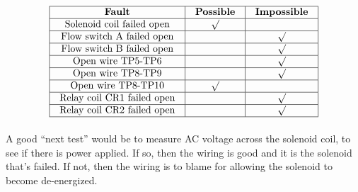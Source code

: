 
$$\vbox{\offinterlineskip
\halign{\strut
\vrule \quad\hfil # \ \hfil & 
\vrule \quad\hfil # \ \hfil & 
\vrule \quad\hfil # \ \hfil \vrule \cr
\noalign{\hrule}
%
{\bf Fault} & {\bf Possible} & {\bf Impossible} \cr
%
\noalign{\hrule}
%
Solenoid coil failed open & $\surd$ &  \cr
%
\noalign{\hrule}
%
Flow switch A failed open &  & $\surd$ \cr
%
\noalign{\hrule}
%
Flow switch B failed open &  & $\surd$ \cr
%
\noalign{\hrule}
%
Open wire TP5-TP6 &  & $\surd$ \cr
%
\noalign{\hrule}
%
Open wire TP8-TP9 &  & $\surd$ \cr
%
\noalign{\hrule}
%
Open wire TP8-TP10 & $\surd$ &  \cr
%
\noalign{\hrule}
%
Relay coil CR1 failed open &  & $\surd$ \cr
%
\noalign{\hrule}
%
Relay coil CR2 failed open &  & $\surd$ \cr
%
\noalign{\hrule}
} %
}$$ %

A good ``next test'' would be to measure AC voltage across the solenoid coil, to see if there is power applied.  If so, then the wiring is good and it is the solenoid that's failed.  If not, then the wiring is to blame for allowing the solenoid to become de-energized.





